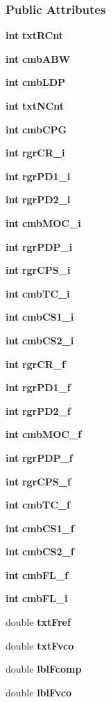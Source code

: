 \subsubsection*{Public Attributes}
\begin{DoxyCompactItemize}
\item 
{\bf int} {\bf txt\+R\+Cnt}
\item 
{\bf int} {\bf cmb\+A\+BW}
\item 
{\bf int} {\bf cmb\+L\+DP}
\item 
{\bf int} {\bf txt\+N\+Cnt}
\item 
{\bf int} {\bf cmb\+C\+PG}
\item 
{\bf int} {\bf rgr\+C\+R\+\_\+i}
\item 
{\bf int} {\bf rgr\+P\+D1\+\_\+i}
\item 
{\bf int} {\bf rgr\+P\+D2\+\_\+i}
\item 
{\bf int} {\bf cmb\+M\+O\+C\+\_\+i}
\item 
{\bf int} {\bf rgr\+P\+D\+P\+\_\+i}
\item 
{\bf int} {\bf rgr\+C\+P\+S\+\_\+i}
\item 
{\bf int} {\bf cmb\+T\+C\+\_\+i}
\item 
{\bf int} {\bf cmb\+C\+S1\+\_\+i}
\item 
{\bf int} {\bf cmb\+C\+S2\+\_\+i}
\item 
{\bf int} {\bf rgr\+C\+R\+\_\+f}
\item 
{\bf int} {\bf rgr\+P\+D1\+\_\+f}
\item 
{\bf int} {\bf rgr\+P\+D2\+\_\+f}
\item 
{\bf int} {\bf cmb\+M\+O\+C\+\_\+f}
\item 
{\bf int} {\bf rgr\+P\+D\+P\+\_\+f}
\item 
{\bf int} {\bf rgr\+C\+P\+S\+\_\+f}
\item 
{\bf int} {\bf cmb\+T\+C\+\_\+f}
\item 
{\bf int} {\bf cmb\+C\+S1\+\_\+f}
\item 
{\bf int} {\bf cmb\+C\+S2\+\_\+f}
\item 
{\bf int} {\bf cmb\+F\+L\+\_\+f}
\item 
{\bf int} {\bf cmb\+F\+L\+\_\+i}
\item 
double {\bf txt\+Fref}
\item 
double {\bf txt\+Fvco}
\item 
double {\bf lbl\+Fcomp}
\item 
double {\bf lbl\+Fvco}
\end{DoxyCompactItemize}
